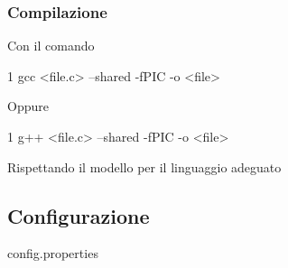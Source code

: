 \subsubsection*{Compilazione}

Con il comando 
\begin{DoxyCode}
1 gcc <file.c> --shared -fPIC -o <file>
\end{DoxyCode}
 Oppure 
\begin{DoxyCode}
1 g++ <file.c> --shared -fPIC -o <file>
\end{DoxyCode}
 Rispettando il modello per il linguaggio adeguato

\subsection*{Configurazione}

config.\+properties


